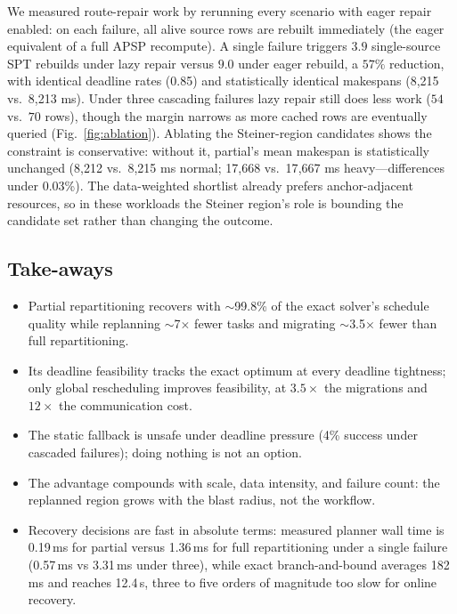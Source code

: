 \documentclass[conference]{IEEEtran}
\theoremstyle{remark}
\begin{document}
We measured route-repair work by rerunning every scenario with eager
repair enabled: on each failure, all alive source rows are rebuilt
immediately (the eager equivalent of a full APSP recompute). A single
failure triggers $3.9$ single-source SPT rebuilds under lazy repair
versus $9.0$ under eager rebuild, a $57\%$ reduction, with identical
deadline rates (0.85) and statistically identical makespans (8{,}215 vs.\
8{,}213 ms). Under three cascading failures lazy repair still does less
work ($54$ vs.\ $70$ rows), though the margin narrows as more cached rows
are eventually queried (Fig.~\ref{fig:ablation}). Ablating the
Steiner-region candidates shows the constraint is conservative: without
it, partial's mean makespan is statistically unchanged (8{,}212 vs.\
8{,}215 ms normal; 17{,}668 vs.\ 17{,}667 ms heavy---differences under
0.03\%). The data-weighted shortlist already prefers anchor-adjacent
resources, so in these workloads the Steiner region's role is bounding
the candidate set rather than changing the outcome.

\subsection{Take-aways}

\begin{itemize}
  \item Partial repartitioning recovers with $\sim$99.8\% of the exact
        solver's schedule quality while replanning $\sim$7$\times$ fewer
        tasks and migrating $\sim$3.5$\times$ fewer than full repartitioning.
  \item Its deadline feasibility tracks the exact optimum at every deadline
        tightness; only global rescheduling improves feasibility, at
        $3.5\times$ the migrations and $12\times$ the communication cost.
  \item The static fallback is unsafe under deadline pressure (4\% success
        under cascaded failures); doing nothing is not an option.
  \item The advantage compounds with scale, data intensity, and failure
        count: the replanned region grows with the blast radius, not the
        workflow.
  \item Recovery decisions are fast in absolute terms: measured planner
        wall time is 0.19\,ms for partial versus 1.36\,ms for full
        repartitioning under a single failure (0.57\,ms vs 3.31\,ms under
        three), while exact branch-and-bound averages 182\,ms and reaches
        12.4\,s, three to five orders of magnitude too slow for online
        recovery.
\end{itemize}
\end{document}
